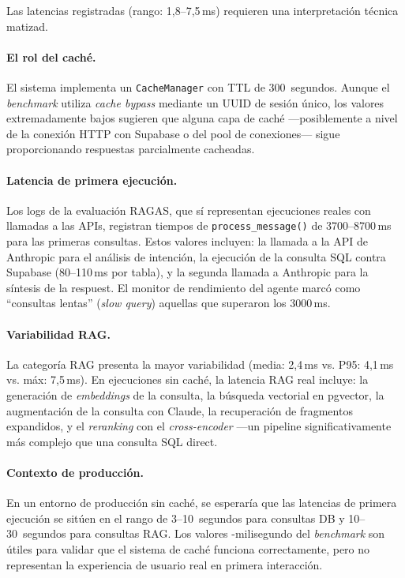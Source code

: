 Las latencias registradas (rango: 1,8--7,5\,ms) requieren una interpretación técnica matizad.

\paragraph{El rol del caché.} El sistema implementa un \texttt{CacheManager} con \ac{TTL} de 300~segundos. Aunque el \textit{benchmark} utiliza \textit{cache bypass} mediante un UUID de sesión único, los valores extremadamente bajos sugieren que alguna capa de caché ---posiblemente a nivel de la conexión HTTP con Supabase o del pool de conexiones--- sigue proporcionando respuestas parcialmente cacheadas.

\paragraph{Latencia de primera ejecución.} Los logs de la evaluación \ac{RAGAS}, que sí representan ejecuciones reales con llamadas a las APIs, registran tiempos de \texttt{process\_message()} de 3700--8700\,ms para las primeras consultas. Estos valores incluyen: la llamada a la \ac{API} de Anthropic para el análisis de intención, la ejecución de la consulta \ac{SQL} contra Supabase (80--110\,ms por tabla), y la segunda llamada a Anthropic para la síntesis de la respuest. El monitor de rendimiento del agente marcó como ``consultas lentas'' (\textit{slow query}) aquellas que superaron los 3000\,ms.

\paragraph{Variabilidad \ac{RAG}.} La categoría \ac{RAG} presenta la mayor variabilidad (media: 2,4\,ms vs. P95: 4,1\,ms vs. máx: 7,5\,ms). En ejecuciones sin caché, la latencia \ac{RAG} real incluye: la generación de \textit{embeddings} de la consulta, la búsqueda vectorial en pgvector, la augmentación de la consulta con Claude, la recuperación de fragmentos expandidos, y el \textit{reranking} con el \textit{cross-encoder} ---un pipeline significativamente más complejo que una consulta \ac{SQL} direct.

\paragraph{Contexto de producción.} En un entorno de producción sin caché, se esperaría que las latencias de primera ejecución se sitúen en el rango de 3--10~segundos para consultas DB y 10--30~segundos para consultas \ac{RAG}. Los valores -milisegundo del \textit{benchmark} son útiles para validar que el sistema de caché funciona correctamente, pero no representan la experiencia de usuario real en primera interacción.


